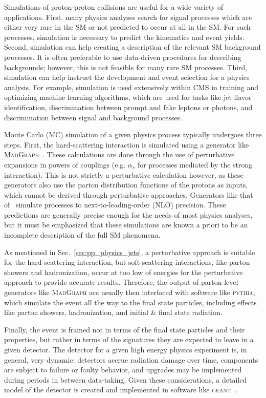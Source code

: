 Simulations of proton-proton collisions are useful for a wide variety of applications.
First, many physics analyses search for signal processes which are either very rare in the SM or not predicted to occur at all in the SM. For such processes, simulation is necessary to predict the kinematics and event yields.
Second, simulation can help creating a description of the relevant SM background processes.
It is often preferable to use data-driven procedures for describing backgrounds; however, this is not feasible for many rare SM processes.
Third, simulation can help instruct the development and event selection for a physics analysis.
For example, simulation is used extensively within CMS in training and optimizing machine learning algorithms, which are used for tasks like jet flavor identification, discrimination between prompt and fake leptons or photons, and discrimination between signal and background processes.

Monte Carlo (MC) simulation of a given physics process typically undergoes three steps.
First, the hard-scattering interaction is simulated using a generator like \textsc{MadGraph}~\cite{Alwall:2014hca}.
These calculations are done through the use of perturbative expansions in powers of couplings (e.g. $\alpha_s$ for processes mediated by the strong interaction).
This is not strictly a perturbative calculation however, as these generators also use the parton distribution functions of the protons as inputs, which cannot be derived through perturbative approaches.
Generators like that of~\cite{Alwall:2014hca} simulate processes to next-to-leading-order (NLO) precision.
These predictions are generally precise enough for the needs of most physics analyses, but it must be emphasized that these simulations are known a priori to be an incomplete description of the full SM phenomena.

As mentioned in Sec.~\ref{sec:pp_physics_jets}, a perturbative approach is suitable for the hard-scattering interaction, but soft-scattering interactions, like parton showers and hadronization, occur at too low of energies for the perturbative approach to provide accurate results.
Therefore, the output of parton-level generators like \textsc{MadGraph} are usually then interfaced with software like \textsc{pythia}, which simulate the event all the way to the final state particles, including effects like parton showers, hadronization, and initial \& final state radiation.

Finally, the event is framed not in terms of the final state particles and their properties, but rather in terms of the signatures they are expected to leave in a given detector.
The detector for a given high energy physics experiment is, in general, very dynamic: detectors accrue radiation damage over time, components are subject to failure or faulty behavior, and upgrades may be implemented during periods in between data-taking.
Given these considerations, a detailed model of the detector is created and implemented in software like \textsc{geant}~\cite{Agostinelli:2002hh}.
